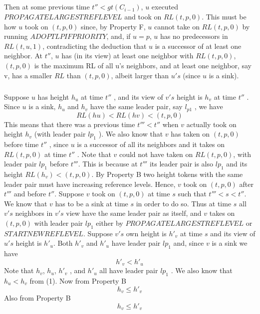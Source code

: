 \subparagraph{}Then at some previous time $t'' < gt(C_{i-1})$, $u$ executed $PROPAGATELARGESTREFLEVEL$ and took on $RL (t, p, 0)$. This must be how $u$ took on $(t, p, 0)$ since, by Property F, $u$ cannot take on $RL (t, p, 0)$ by running $ADOPTLPIFPRIORITY$, and, if $u = p$, $u$ has no predecessors in $RL (t, u, 1)$, contradicting the deduction that $u$ is a successor of at least one neighbor. At $t''$, $u$ has (in its view) at least one neighbor with $RL (t, p, 0)$, $(t, p, 0)$ is the maximum RL of all u's neighbors, and at least one neighbor, say v, has a smaller $RL$ than $(t, p, 0)$, albeit larger than $u's$ (since $u$ is a sink).
\subparagraph{}Suppose $u$ has height $h_u$ at time $t''$ , and its view of $v's$ height is $h_v$ at time $t''$ . Since $u$ is a sink, $h_u$ and $h_v$ have the same leader pair, say $l_{p1}$ , we have
\begin{equation}
RL(hu ) < RL(hv ) < (t, p, 0)
\end{equation}
This means that there was a previous time $t ''' < t ''$ when $v$ actually took on height $h_v$ (with leader pair $lp_1$ ). We also know that $v$ has taken on $(t, p, 0)$ before time $t ''$ , since $u$ is a successor of all its neighbors and it takes on $RL (t, p, 0)$ at time $t ''$ . Note that $v$ could not have taken on $RL (t, p, 0)$, with leader pair $lp_1$ before $t '''$. This is because at $t '''$ its leader pair is also $lp_1$ and its height $RL(h_v ) < (t, p, 0)$. By Property B two height tokens with the same leader pair must have increasing reference levels. Hence, $v$ took on $(t, p, 0)$ after $t '''$ and before $t ''$. Suppose $v$ took on $(t, p, 0)$ at time $s$ such that $t ''' < s < t ''$. We know that $v$ has to be a sink at time $s$ in order to do so. Thus at time $s$ all $v's$ neighbors in $v's$ view have the same leader pair as itself, and $v$ takes on $(t, p, 0)$ with leader pair $lp_1$ either by $PROPAGATELARGESTREFLEVEL$ or $STARTNEWREFLEVEL$. Suppose $v's$ own height is $h'_v$ at time $s$ and its view of $u's$ height is $h'_u$. Both $h'_v$ and $h'_u$ have leader pair $lp_1$ and, since $v$ is a sink we have
\begin{equation}
h'_v < h'_u
\end{equation}
Note that $h_v$, $h_u$, $h'_v$ , and $h'_u$ all have leader pair $lp_1$ . We also know that $h_u < h_v$ from (1). Now from Property B
\begin{equation}
h_v \leq h'_v
\end{equation}
Also from Property B
\begin{equation}
h_v \leq h'_v
\end{equation}
